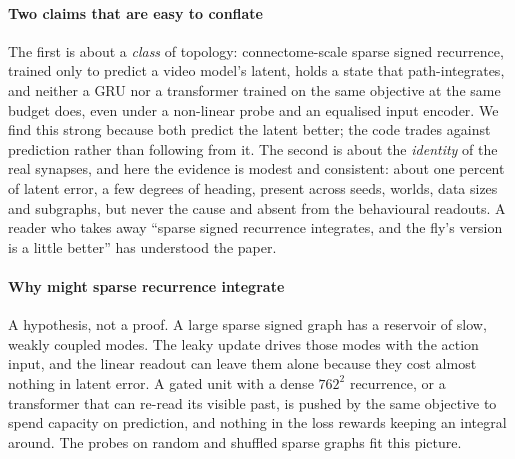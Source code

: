 \paragraph{Two claims that are easy to conflate}
The first is about a \emph{class} of topology: connectome-scale sparse signed recurrence, trained only to predict a
video model's latent, holds a state that path-integrates, and neither a GRU nor a transformer trained on the same
objective at the same budget does, even under a non-linear probe and an equalised input encoder. We find this strong
because both predict the latent better; the code trades against prediction rather than following from it. The second
is about the \emph{identity} of the real synapses, and here the evidence is modest and consistent: about one percent of
latent error, a few degrees of heading, present across seeds, worlds, data sizes and subgraphs, but never the cause and
absent from the behavioural readouts. A reader who takes away ``sparse signed recurrence integrates, and the fly's
version is a little better'' has understood the paper.

\paragraph{Why might sparse recurrence integrate}
A hypothesis, not a proof. A large sparse signed graph has a reservoir of slow, weakly coupled modes. The leaky update
drives those modes with the action input, and the linear readout can leave them alone because they cost almost
nothing in latent error. A gated unit with a dense $762^2$ recurrence, or a transformer that can re-read its visible
past, is pushed by the same objective to spend capacity on prediction, and nothing in the loss rewards keeping an
integral around. The probes on random and shuffled sparse graphs fit this picture.

